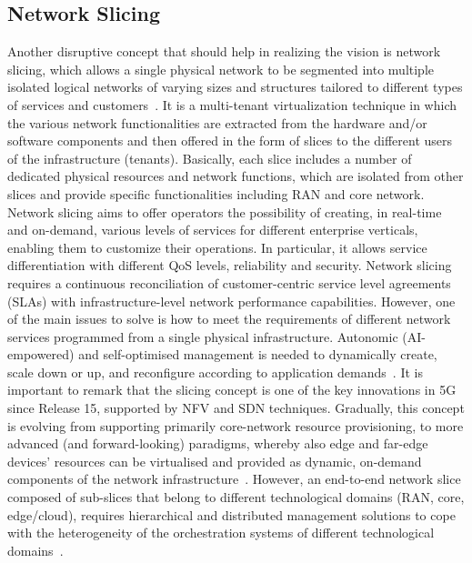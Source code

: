 \subsection{Network Slicing}
Another disruptive concept that should help in realizing the vision is network slicing, which allows a single physical network to be segmented into multiple isolated logical networks of varying sizes and structures tailored to different types of services and customers~\cite{2018_cst_slicing}. It is a multi-tenant virtualization technique in which the various network functionalities are extracted from the hardware and/or software components and then offered in the form of slices to the different users of the infrastructure (tenants). Basically, each slice includes a number of dedicated physical resources and network functions, which are isolated from other slices and provide specific functionalities including RAN and core network. Network slicing aims to offer operators the possibility of creating, in real-time and on-demand, various levels of services for different enterprise verticals, enabling them to customize their operations. In particular, it allows service differentiation with different QoS levels, reliability and security. Network slicing requires a continuous reconciliation of customer-centric service level agreements (SLAs) with infrastructure-level network performance capabilities. However, one of the main issues to solve is how to meet the requirements of different network services programmed from a single physical infrastructure. Autonomic (AI-empowered) and self-optimised management is needed to dynamically create, scale down or up, and reconfigure according to application demands~\cite{2018_jsac_nfv,2022_6g_slicing}. It is important to remark that the slicing concept is one of the key innovations in 5G since Release 15, supported by NFV and SDN techniques. Gradually, this concept is evolving from supporting primarily core-network resource provisioning, to more advanced (and forward-looking) paradigms, whereby also edge and far-edge devices' resources can be virtualised and provided as dynamic, on-demand components of the network infrastructure~\cite{6953022,dressler22}. However, an end-to-end network slice composed of sub-slices that belong to different technological
domains (RAN, core, edge/cloud), requires hierarchical and distributed management solutions to cope with the heterogeneity of the orchestration systems of different technological domains~\cite{2018_access_slicing, 2022_access_zero-touch}. 

